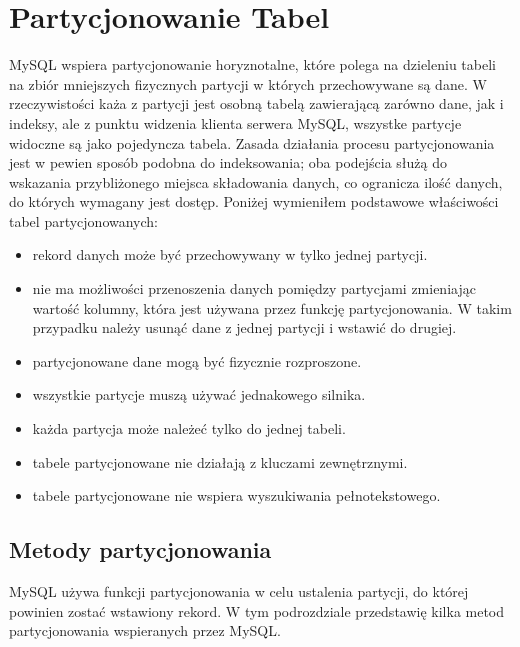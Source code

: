 \section{Partycjonowanie Tabel}
MySQL wspiera partycjonowanie horyznotalne, które polega na dzieleniu tabeli na zbiór mniejszych fizycznych partycji w których przechowywane są dane. W rzeczywistości każa z partycji jest osobną tabelą zawierającą zarówno dane, jak i indeksy, ale z punktu widzenia klienta serwera MySQL, wszystke partycje widoczne są jako pojedyncza tabela. Zasada działania procesu partycjonowania jest w pewien sposób podobna do indeksowania; oba podejścia służą do wskazania przybliżonego miejsca składowania danych, co ogranicza ilość danych, do których wymagany jest dostęp.
Poniżej wymieniłem podstawowe właściwości tabel partycjonowanych:
\begin{itemize}
	\item rekord danych może być przechowywany w tylko jednej partycji.
	\item nie ma możliwości przenoszenia danych pomiędzy partycjami zmieniając wartość kolumny, która jest używana przez funkcję partycjonowania. W takim przypadku należy usunąć dane z jednej partycji i wstawić do drugiej.
	\item partycjonowane dane mogą być fizycznie rozproszone.
	\item wszystkie partycje muszą używać jednakowego silnika.
	\item każda partycja może należeć tylko do jednej tabeli.
	\item tabele partycjonowane nie działają z kluczami zewnętrznymi.
	\item tabele partycjonowane nie wspiera wyszukiwania pełnotekstowego.
\end{itemize} 

\subsection{Metody partycjonowania}
MySQL używa funkcji partycjonowania w celu ustalenia partycji, do której powinien zostać wstawiony rekord. W tym podrozdziale przedstawię kilka metod partycjonowania wspieranych przez MySQL.


